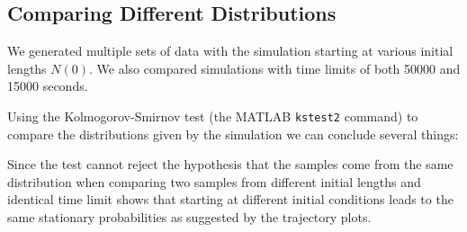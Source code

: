 \documentclass[titlepage]{article}
\begin{document}




\subsection{Comparing Different Distributions}
We generated multiple sets of data with the simulation starting at various initial lengths $N(0)$.
We also compared simulations with time limits of both 50000 and 15000 seconds.

Using the Kolmogorov-Smirnov test (the MATLAB \texttt{kstest2} command) to compare the distributions given by the simulation we can conclude several things:

Since the test cannot reject the hypothesis that the samples come from the same distribution when comparing two samples from different initial lengths and identical time limit shows that starting at different initial conditions leads to the same stationary probabilities as suggested by the trajectory plots.
\end{document}
